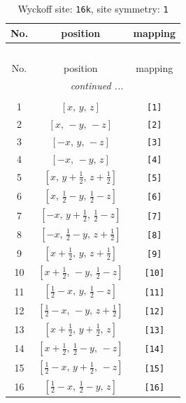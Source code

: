 \documentclass[fleqn,8pt]{jsarticle}
\begin{document}
\begin{longtable}{ccc}
\caption{Wyckoff site: {\tt 16k}, site symmetry: {\tt 1}}
 \\
 \hline \hline
No. & position & mapping \\ \hline \endfirsthead

\multicolumn{2}{l}{\tablename\ \thetable{}} \\
 \hline \hline
No. & position & mapping \\ \hline \endhead

 \hline \hline
\multicolumn{2}{r}{\footnotesize\it continued ...} \\ \endfoot

 \hline \hline
\multicolumn{2}{r}{} \\ \endlastfoot

1 & $\left[ x,\, y,\, z \right]$ & {\tt [1]} \\ \hline
2 & $\left[ x,\, - y,\, - z \right]$ & {\tt [2]} \\ \hline
3 & $\left[ - x,\, y,\, - z \right]$ & {\tt [3]} \\ \hline
4 & $\left[ - x,\, - y,\, z \right]$ & {\tt [4]} \\ \hline
5 & $\left[ x,\, y + \frac{1}{2},\, z + \frac{1}{2} \right]$ & {\tt [5]} \\ \hline
6 & $\left[ x,\, \frac{1}{2} - y,\, \frac{1}{2} - z \right]$ & {\tt [6]} \\ \hline
7 & $\left[ - x,\, y + \frac{1}{2},\, \frac{1}{2} - z \right]$ & {\tt [7]} \\ \hline
8 & $\left[ - x,\, \frac{1}{2} - y,\, z + \frac{1}{2} \right]$ & {\tt [8]} \\ \hline
9 & $\left[ x + \frac{1}{2},\, y,\, z + \frac{1}{2} \right]$ & {\tt [9]} \\ \hline
10 & $\left[ x + \frac{1}{2},\, - y,\, \frac{1}{2} - z \right]$ & {\tt [10]} \\ \hline
11 & $\left[ \frac{1}{2} - x,\, y,\, \frac{1}{2} - z \right]$ & {\tt [11]} \\ \hline
12 & $\left[ \frac{1}{2} - x,\, - y,\, z + \frac{1}{2} \right]$ & {\tt [12]} \\ \hline
13 & $\left[ x + \frac{1}{2},\, y + \frac{1}{2},\, z \right]$ & {\tt [13]} \\ \hline
14 & $\left[ x + \frac{1}{2},\, \frac{1}{2} - y,\, - z \right]$ & {\tt [14]} \\ \hline
15 & $\left[ \frac{1}{2} - x,\, y + \frac{1}{2},\, - z \right]$ & {\tt [15]} \\ \hline
16 & $\left[ \frac{1}{2} - x,\, \frac{1}{2} - y,\, z \right]$ & {\tt [16]} \\
\end{longtable}
\end{document}
